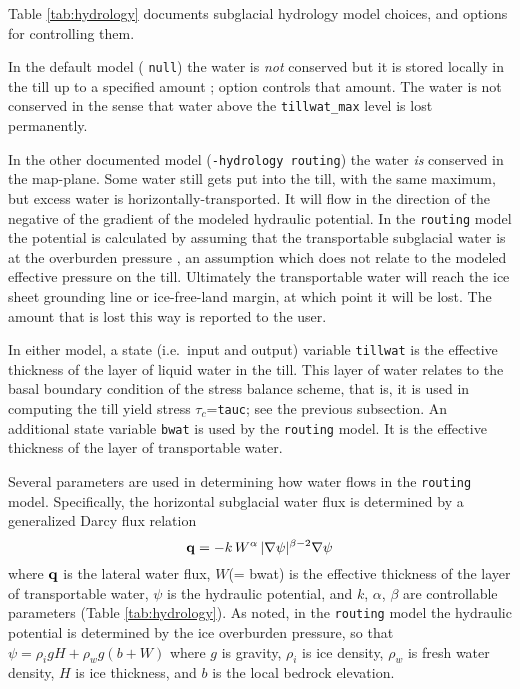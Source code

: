 Table \ref{tab:hydrology} documents subglacial hydrology model choices, and options for controlling them.

In the default model ( \texttt{null}) the water is \emph{not} conserved but it is stored locally in the till up to a specified amount \cite{BBssasliding}; option  controls that amount.  The water is not conserved in the sense that water above the \texttt{tillwat_max} level is lost permanently.

In the other documented model (\texttt{-hydrology routing}) the water \emph{is} conserved in the map-plane.  Some water still gets put into the till, with the same maximum, but excess water is horizontally-transported.  It will flow in the direction of the negative of the gradient of the modeled hydraulic potential.  In the \texttt{routing} model the potential is calculated by assuming that the transportable subglacial water is at the overburden pressure \cite{Siegertetal2009}, an assumption which does not relate to the modeled effective pressure on the till.  Ultimately the transportable water will reach the ice sheet grounding line or ice-free-land margin, at which point it will be lost.  The amount that is lost this way is reported to the user.

In either model, a state (i.e.~input and output) variable \texttt{tillwat} is the effective thickness of the layer of liquid water in the till.  This layer of water relates to the basal boundary condition of the stress balance scheme, that is, it is used in computing the till yield stress $\tau_c$=\texttt{tauc}; see the previous subsection.  An additional state variable \texttt{bwat} is used by the  \texttt{routing} model.  It is the effective thickness of the layer of transportable water.

Several parameters are used in determining how water flows in the \texttt{routing} model.  Specifically, the horizontal subglacial water flux is determined by a generalized Darcy flux relation \cite{Clarke05,Schoofetal2012}
\begin{equation}  \label{eq:flux}
\mathbf{q} = - k\, W^\alpha\, |\nabla \psi|^{\beta-2} \nabla \psi
\end{equation}
where $\mathbf{q}$ is the lateral water flux, $W$(= bwat) is the effective thickness of the layer of transportable water, $\psi$ is the hydraulic potential, and $k$, $\alpha$, $\beta$ are controllable parameters (Table \ref{tab:hydrology}).  As noted, in the \texttt{routing} model the hydraulic potential is determined by the ice overburden pressure, so that $\psi = \rho_i g H + \rho_w g (b + W)$ where $g$ is gravity, $\rho_i$ is ice density, $\rho_w$ is fresh water density, $H$ is ice thickness, and $b$ is the local bedrock elevation.

